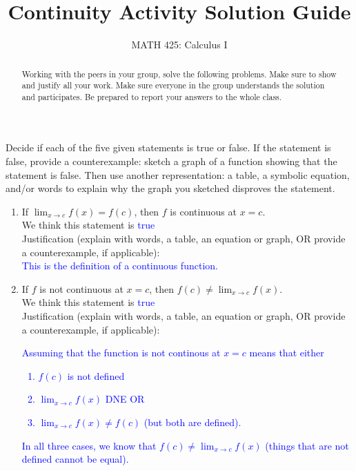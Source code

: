 \documentclass{ximera}
\title{Continuity Activity Solution Guide}
\author{MATH 425: Calculus I}
\begin{document}
\begin{abstract}
     Working with the peers in your group, solve the following problems. Make sure to show and justify all your work. Make sure everyone in the group understands the solution and participates. Be prepared to report your answers to the whole class. 
\end{abstract}
\maketitle

\begin{exercise}
     Decide if each of the five given statements is true or false.  If the statement is false, provide a counterexample: sketch a graph of a function showing that the statement is false.  Then use another representation: a table, a symbolic equation, and/or words to explain why the graph you sketched disproves the statement. 
    \begin{enumerate}
        \item If $\lim_{x\rightarrow c}f(x)=f(c)$, then $f$ is continuous at $x=c$.  \\
        We think this statement is \textcolor{blue}{true}\\
        Justification (explain with words, a table, an equation or graph, OR provide a counterexample, if applicable):\\
        \textcolor{blue}{ This is the definition of a continuous function.  }
        \item If $f$ is not continuous at $x=c$, then $f(c)\neq \lim_{x\rightarrow c}f(x)$.\\
        We think this statement is \textcolor{blue}{true}\\
        Justification (explain with words, a table, an equation or graph, OR provide a counterexample, if applicable):\\
        \textcolor{blue}{Assuming that the function is not continous at $x=c$ means that either 
          \begin{enumerate}
            \item $f(c)$ is not defined 
            \item $\lim_{x\rightarrow c} f(x)$ DNE OR
            \item $\lim_{x\rightarrow c} f(x)\neq f(c)$ (but both are defined). 
          \end{enumerate}
          In all three cases, we know that $f(c)\neq \lim_{x\rightarrow c}f(x)$ (things that are not defined cannot be equal).}

\end{enumerate}
\end{exercise}
\end{document}
